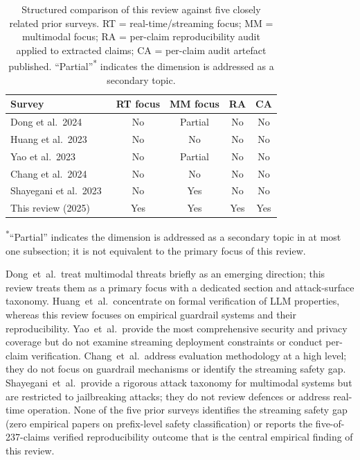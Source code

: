 \begin{table}[h]
  \caption{Structured comparison of this review against five closely related prior
           surveys.
           RT = real-time/streaming focus;
           MM = multimodal focus;
           RA = per-claim reproducibility audit applied to extracted claims;
           CA = per-claim audit artefact published.
           ``Partial''\textsuperscript{*} indicates the dimension is addressed as a secondary topic.}
  \label{tab:survey_comparison}
  \centering
  \begin{tabular}{lcccc}
    \toprule
    \textbf{Survey} & \textbf{RT focus} & \textbf{MM focus} & \textbf{RA} & \textbf{CA} \\
    \midrule
    Dong et al.\ 2024~\cite{dong2024building}         & No      & Partial & No  & No \\
    Huang et al.\ 2023~\cite{huang2023survey}         & No      & No      & No  & No \\
    Yao et al.\ 2023~\cite{yao2023survey}             & No      & Partial & No  & No \\
    Chang et al.\ 2024~\cite{chang2024survey}         & No      & No      & No  & No \\
    Shayegani et al.\ 2023~\cite{shayegani2023jailbreak} & No  & Yes     & No  & No \\
    This review (2025)                                & Yes     & Yes     & Yes & Yes \\
    \bottomrule
  \end{tabular}
  \par\smallskip\noindent\small\textsuperscript{*}``Partial'' indicates the dimension is addressed as a secondary topic in at most one subsection; it is not equivalent to the primary focus of this review.
\end{table}

\noindent
Dong~et~al.\ treat multimodal threats briefly as an emerging direction; this review
treats them as a primary focus with a dedicated section and attack-surface taxonomy.
Huang~et~al.\ concentrate on formal verification of LLM properties, whereas this
review focuses on empirical guardrail systems and their reproducibility.
Yao~et~al.\ provide the most comprehensive security and privacy coverage but do
not examine streaming deployment constraints or conduct per-claim verification.
Chang~et~al.\ address evaluation methodology at a high level; they do not focus
on guardrail mechanisms or identify the streaming safety gap.
Shayegani~et~al.\ provide a rigorous attack taxonomy for multimodal systems but
are restricted to jailbreaking attacks; they do not review defences or address
real-time operation.
None of the five prior surveys identifies the streaming safety gap (zero empirical
papers on prefix-level safety classification) or reports the five-of-237-claims
verified reproducibility outcome that is the central empirical finding of this
review.

